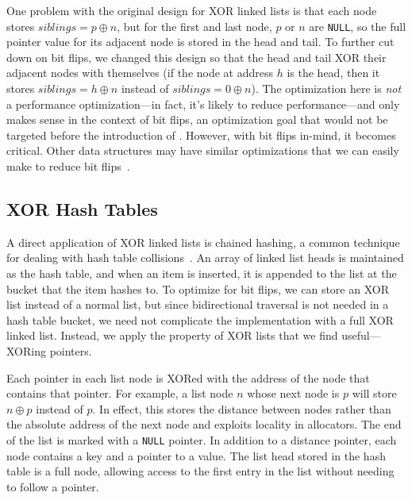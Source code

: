 One problem with the original design for XOR linked lists is that each node
stores $siblings = p \oplus n$, but for the first and last node, $p$ or $n$ are
\texttt{NULL}, so the full pointer value for its adjacent node is stored in the
head and tail. To further cut down on bit flips, we changed this design so that
the head and tail XOR their adjacent nodes with themselves (if the node at
address $h$ is the head, then it stores $siblings = h \oplus n$ instead of
$siblings = 0 \oplus n$). The optimization here is \textit{not} a performance
optimization---in fact, it's likely to reduce performance---and only makes sense
in the context of bit flips, an optimization goal that would not be
targeted before the introduction of \NVM. However, with bit flips in-mind, it
becomes critical. Other data structures may have similar optimizations that we
can easily make to reduce bit flips~.

\subsection{XOR Hash Tables}
\label{sec:xht_design}

A direct application of XOR linked lists is chained hashing, a common
technique for dealing with hash table collisions~\cite{clrs}. An array of linked list heads
is maintained as the hash table, and when an item is inserted, it is appended to
the list at the bucket that the item hashes to. To optimize for bit flips,
we can store an XOR list instead of a normal list, but
since bidirectional traversal is not needed in a hash table
bucket, we need not complicate the implementation with a full XOR linked
list. Instead, we apply the property of XOR lists that we find
useful---XORing pointers.

Each pointer in each list node is XORed with the address of the node that
contains that pointer. For example, a list node $n$ whose next node is $p$ will
store $n \oplus p$ instead of $p$. In effect, this stores the distance between
nodes rather than the absolute address of the next node and exploits
locality in allocators. The end of the list is marked with a \texttt{NULL}
pointer. In addition to a distance pointer, each node contains a key and a
pointer to a value. The list head stored in the hash table is a full node,
allowing access to the first entry in the list without needing to follow a
pointer.

